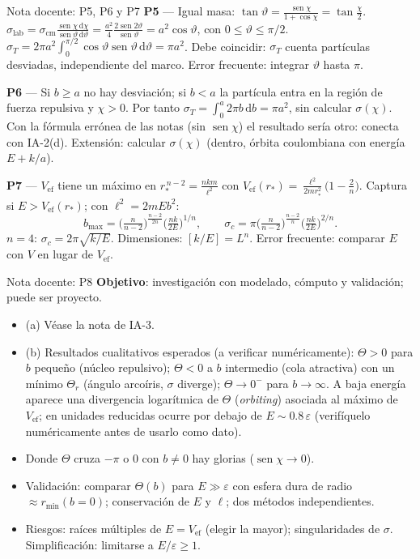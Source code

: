 \documentclass[aspectratio=169]{beamer}
\providecommand{\sen}{}
\renewcommand{\sen}{\operatorname{sen}}
\newcommand{\rmin}{r_{\min}}
\newcommand{\dd}{\mathrm{d}}
\begin{document}
\begin{frame}{Nota docente: P5, P6 y P7}
\footnotesize
\textbf{P5} — Igual masa: $\tan\vartheta=\frac{\sen\chi}{1+\cos\chi}=\tan\frac{\chi}{2}$.
$\sigma_{\text{lab}}=\sigma_{\text{cm}}\frac{\sen\chi\,\dd\chi}{\sen\vartheta\,\dd\vartheta}
=\frac{a^2}{4}\frac{2\sen2\vartheta}{\sen\vartheta}=a^2\cos\vartheta$, con $0\le\vartheta\le\pi/2$.
$\sigma_T=2\pi a^2\int_0^{\pi/2}\cos\vartheta\sen\vartheta\,\dd\vartheta=\pi a^2$. \checkmark\;
Debe coincidir: $\sigma_T$ cuenta partículas desviadas, independiente del marco.
Error frecuente: integrar $\vartheta$ hasta $\pi$.

\textbf{P6} — Si $b\ge a$ no hay desviación; si $b<a$ la partícula entra en la región de fuerza
repulsiva y $\chi>0$. Por tanto $\sigma_T=\int_0^a2\pi b\,\dd b=\pi a^2$, sin calcular $\sigma(\chi)$.
Con la fórmula errónea de las notas (sin $\sen\chi$) el resultado sería otro: conecta con IA-2(d).
Extensión: calcular $\sigma(\chi)$ (dentro, órbita coulombiana con energía $E+k/a$).

\textbf{P7} — $V_{\text{ef}}$ tiene un máximo en $r_*^{\,n-2}=\frac{nkm}{\ell^2}$ con
$V_{\text{ef}}(r_*)=\frac{\ell^2}{2mr_*^2}\big(1-\frac2n\big)$. Captura si $E>V_{\text{ef}}(r_*)$; con
$\ell^2=2mEb^2$:
\[
b_{\max}=\Big(\tfrac{n}{n-2}\Big)^{\frac{n-2}{2n}}\Big(\tfrac{nk}{2E}\Big)^{1/n},\qquad
\sigma_c=\pi\Big(\tfrac{n}{n-2}\Big)^{\frac{n-2}{n}}\Big(\tfrac{nk}{2E}\Big)^{2/n}.
\]
$n=4$: $\sigma_c=2\pi\sqrt{k/E}$. \checkmark\; Dimensiones: $[k/E]=L^n$.
Error frecuente: comparar $E$ con $V$ en lugar de $V_{\text{ef}}$.
\end{frame}

\begin{frame}{Nota docente: P8}
\footnotesize
\textbf{Objetivo}: investigación con modelado, cómputo y validación; puede ser proyecto.
\begin{itemize}
  \item (a) Véase la nota de IA-3.
  \item (b) Resultados cualitativos esperados (a verificar numéricamente):
        $\Theta>0$ para $b$ pequeño (núcleo repulsivo); $\Theta<0$ a $b$ intermedio (cola
        atractiva) con un mínimo $\Theta_r$ (ángulo arcoíris, $\sigma$ diverge); $\Theta\to0^-$
        para $b\to\infty$. A baja energía aparece una divergencia logarítmica de $\Theta$
        (\emph{orbiting}) asociada al máximo de $V_{\text{ef}}$; en unidades reducidas ocurre por
        debajo de $E\sim0.8\,\varepsilon$ (verifíquelo numéricamente antes de usarlo como dato).
  \item Donde $\Theta$ cruza $-\pi$ o $0$ con $b\neq0$ hay glorias ($\sen\chi\to0$).
  \item Validación: comparar $\Theta(b)$ para $E\gg\varepsilon$ con esfera dura de radio
        $\approx\rmin(b=0)$; conservación de $E$ y $\ell$; dos métodos independientes.
  \item Riesgos: raíces múltiples de $E=V_{\text{ef}}$ (elegir la mayor); singularidades de $\sigma$.
        Simplificación: limitarse a $E/\varepsilon\ge1$.
\end{itemize}
\end{frame}
\fi
\end{document}
